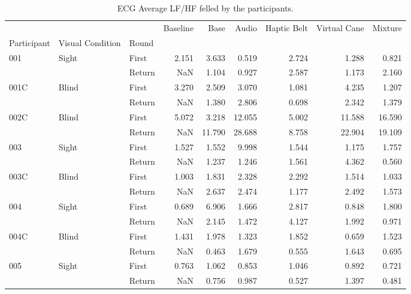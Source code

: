 
\begin{table}[!htb]
\centering
\caption{ECG Average LF/HF felled by the participants.}
\label{tab:ecg_lfhf_table}
\begin{tabular}{lllrrrrrr}
\toprule
    &       &        &  Baseline &   Base &  Audio &  Haptic Belt &  Virtual Cane &  Mixture \\
Participant & Visual Condition & Round &           &        &        &              &               &          \\
\midrule
001 & Sight & First &     2.151 &  3.633 &  0.519 &        2.724 &         1.288 &    0.821 \\
    &       & Return &       NaN &  1.104 &  0.927 &        2.587 &         1.173 &    2.160 \\
001C & Blind & First &     3.270 &  2.509 &  3.070 &        1.081 &         4.235 &    1.207 \\
    &       & Return &       NaN &  1.380 &  2.806 &        0.698 &         2.342 &    1.379 \\
002C & Blind & First &     5.072 &  3.218 & 12.055 &        5.002 &        11.588 &   16.590 \\
    &       & Return &       NaN & 11.790 & 28.688 &        8.758 &        22.904 &   19.109 \\
003 & Sight & First &     1.527 &  1.552 &  9.998 &        1.544 &         1.175 &    1.757 \\
    &       & Return &       NaN &  1.237 &  1.246 &        1.561 &         4.362 &    0.560 \\
003C & Blind & First &     1.003 &  1.831 &  2.328 &        2.292 &         1.514 &    1.033 \\
    &       & Return &       NaN &  2.637 &  2.474 &        1.177 &         2.492 &    1.573 \\
004 & Sight & First &     0.689 &  6.906 &  1.666 &        2.817 &         0.848 &    1.800 \\
    &       & Return &       NaN &  2.145 &  1.472 &        4.127 &         1.992 &    0.971 \\
004C & Blind & First &     1.431 &  1.978 &  1.323 &        1.852 &         0.659 &    1.523 \\
    &       & Return &       NaN &  0.463 &  1.679 &        0.555 &         1.643 &    0.695 \\
005 & Sight & First &     0.763 &  1.062 &  0.853 &        1.046 &         0.892 &    0.721 \\
    &       & Return &       NaN &  0.756 &  0.987 &        0.527 &         1.397 &    0.481 \\
\bottomrule
\end{tabular}
\end{table}

